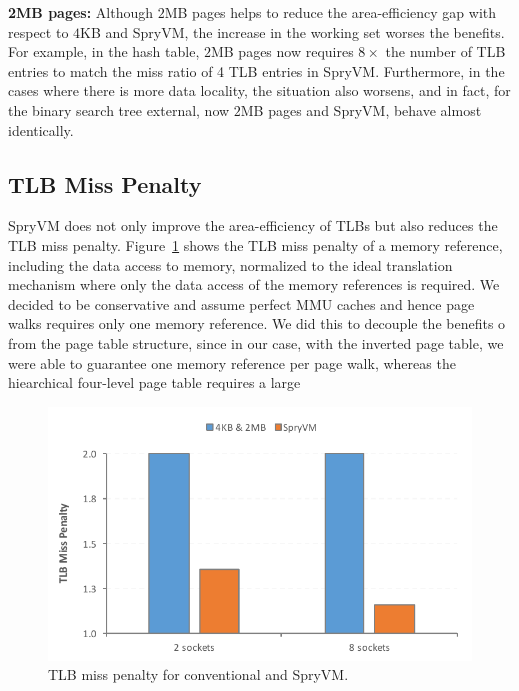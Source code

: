 \noindent\textbf{2MB pages:} Although $2$MB pages helps to reduce the area-efficiency gap with respect to $4$KB and SpryVM, the increase in the working set worses the benefits. For example, in the hash table, $2$MB pages now requires $8\times$ the number of TLB entries to match the miss ratio of 4 TLB entries in SpryVM. Furthermore, in the cases where there is more data locality, the situation also worsens, and in fact, for the binary search tree external, now $2$MB pages and SpryVM, behave almost identically.

\subsection{TLB Miss Penalty}

SpryVM does not only improve the area-efficiency of TLBs but also reduces the TLB miss penalty. Figure~\ref{fig:penalty} shows the TLB miss penalty of a memory reference, including the data access to memory, normalized to the ideal translation mechanism where only the data access of the memory references is required. We decided to be conservative and assume perfect MMU caches and hence page walks requires only one memory reference. We did this to decouple the benefits o from the page table structure, since in our case, with the inverted page table, we were able to guarantee one memory reference per page walk, whereas the hiearchical four-level page table requires a large 

\begin{figure}[t]
	\centering
	\includegraphics[width=1.0\columnwidth]{graphs/penalty.pdf}
	\caption{TLB miss penalty for conventional and SpryVM.}
	\label{fig:penalty}
\end{figure}
